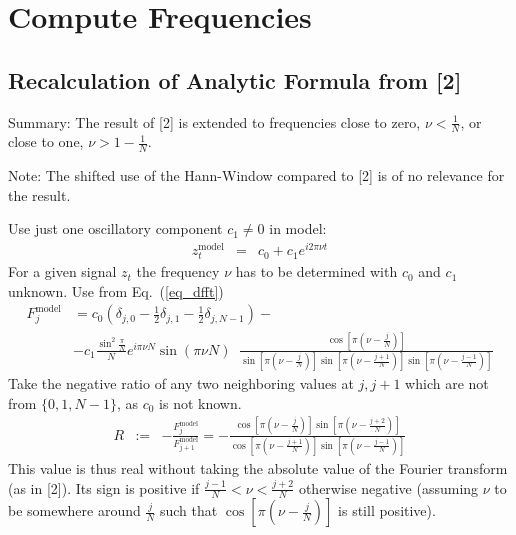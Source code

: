 \documentclass[english, parskip=full]{scrartcl}
\begin{document}
\clearpage
\section{Compute Frequencies}
\subsection{Recalculation of Analytic Formula from [2]}
Summary: The result of [2] is extended to frequencies close to zero, $\nu < \frac 1N$,
or close to one, $\nu > 1-\frac 1N$.

Note: The shifted use of the Hann-Window compared to [2] is
of no relevance for the result.

Use just one oscillatory component $c_1 \ne 0$ in model:
\begin{eqnarray}
  z^{\text{model}}_t &=& c_0 + c_1 e^{i 2 \pi \nu t}
\end{eqnarray}
For a given signal $z_t$ the frequency $\nu$ has to be determined with $c_0$ and $c_1$ unknown.
Use from Eq.~(\ref{eq_dfft})
\begin{align}
  F^{\text{model}}_j &=
  c_0 (\delta_{j,0} - \frac{1}{2} \delta_{j,1} - \frac{1}{2} \delta_{j,N-1} )
  - \\
  &-c_1 \frac{\sin^2 \frac{\pi}{N}}{N}
  e^{i \pi \nu N} \sin(\pi \nu N) \;\;
  \frac{\cos[\pi(\nu - \frac{j}{N})]}
       {\sin[\pi(\nu - \frac{j}{N})] \sin[\pi(\nu - \frac{j+1}{N})] \sin[\pi(\nu - \frac{j-1}{N})]}
\end{align}
Take the negative ratio of any two neighboring values at $j,j+1$ which are not from $\{0,1,N-1\}$, as $c_0$ is not known.
\begin{eqnarray}
  \label{r_frac}
  R &:=&
  - \frac{F^{\text{model}}_j}{F^{\text{model}}_{j+1}} =
  - \frac{\cos[\pi(\nu - \frac{j}{N})]   \sin[\pi(\nu - \frac{j+2}{N})]}
       {\cos[\pi(\nu - \frac{j+1}{N})] \sin[\pi(\nu - \frac{j-1}{N})]}
  \label{eq_defR}
\end{eqnarray}
This value is thus real without taking the absolute value of the Fourier transform (as in [2]).
Its sign is positive if $\frac{j-1}{N} < \nu < \frac{j+2}{N}$ otherwise negative
(assuming $\nu$ to be somewhere around $\frac{j}{N}$ such that $\cos[\pi(\nu - \frac{j}{N})]$
is still positive).
\end{document}
